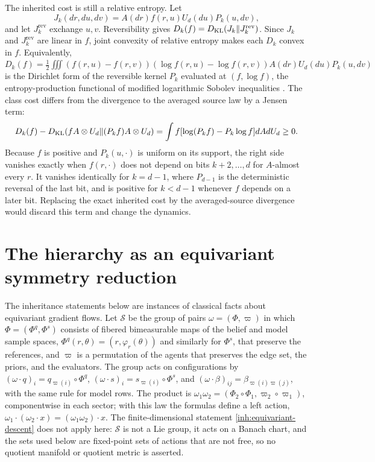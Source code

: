 The inherited cost is still a relative entropy. Let
\begin{equation}
 J_k(dr,du,dv)=A(dr)f(r,u)U_d(du)P_k(u,dv),
\end{equation}
and let $J_k^{\mathrm{rev}}$ exchange $u,v$. Reversibility gives
$D_k(f)=D_{\mathrm{KL}}(J_k\Vert J_k^{\mathrm{rev}})$. Since $J_k$ and $J_k^{\mathrm{rev}}$ are linear in $f$, joint convexity of relative entropy makes each $D_k$ convex in $f$. Equivalently, $D_k(f)=\tfrac12\iiint(f(r,u)-f(r,v))(\log f(r,u)-\log f(r,v))A(dr)U_d(du)P_k(u,dv)$ is the Dirichlet form of the reversible kernel $P_k$ evaluated at $(f,\log f)$, the entropy-production functional of modified logarithmic Sobolev inequalities \citep{BobkovTetali2006}. The class cost differs from the divergence to the averaged source law by a Jensen term:
\begin{equation}
 D_k(f)-D_{\mathrm{KL}}(f A\otimes U_d\Vert(P_kf) A\otimes U_d)
 =\int f[\log(P_kf)-P_k\log f]dA dU_d\ge0.
 \label{eq:boundary-tree-jensen}
\end{equation}
Because $f$ is positive and $P_k(u,\cdot)$ is uniform on its support, the right side vanishes exactly when $f(r,\cdot)$ does not depend on bits $k+2,\ldots,d$ for $A$-almost every $r$. It vanishes identically for $k=d-1$, where $P_{d-1}$ is the deterministic reversal of the last bit, and is positive for $k<d-1$ whenever $f$ depends on a later bit. Replacing the exact inherited cost by the averaged-source divergence would discard this term and change the dynamics.

\section{The hierarchy as an equivariant symmetry reduction}
\label{sec:boundary-symmetry}

The inheritance statements below are instances of classical facts about equivariant gradient flows. Let $\mathcal S$ be the group of pairs $\omega=(\Phi,\varpi)$ in which $\Phi=(\Phi^q,\Phi^s)$ consists of fibered bimeasurable maps of the belief and model sample spaces, $\Phi^q(r,\theta)=(r,\varphi_r(\theta))$ and similarly for $\Phi^s$, that preserve the references, and $\varpi$ is a permutation of the agents that preserves the edge set, the priors, and the evaluators. The group acts on configurations by $(\omega\cdot q)_i=q_{\varpi(i)}\circ\Phi^q$, $(\omega\cdot s)_i=s_{\varpi(i)}\circ\Phi^s$, and $(\omega\cdot\beta)_{ij}=\beta_{\varpi(i)\varpi(j)}$, with the same rule for model rows. The product is $\omega_1\omega_2=(\Phi_2\circ\Phi_1,\varpi_2\circ\varpi_1)$, componentwise in each sector; with this law the formulas define a left action, $\omega_1\cdot(\omega_2\cdot x)=(\omega_1\omega_2)\cdot x$. The finite-dimensional statement \cref{inh:equivariant-descent} does not apply here: $\mathcal S$ is not a Lie group, it acts on a Banach chart, and the sets used below are fixed-point sets of actions that are not free, so no quotient manifold or quotient metric is asserted.

